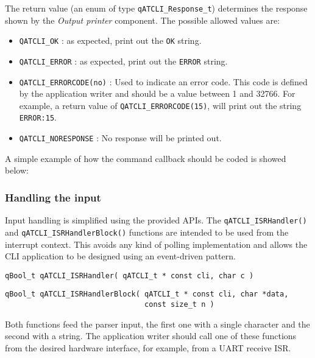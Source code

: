 The return value (an enum of type \lstinline{qATCLI_Response_t})  determines the response shown by the \textit{Output printer} component. The possible allowed values are:

\begin{itemize}
    \item \lstinline{QATCLI_OK} : as expected, print out the \lstinline{OK} string.
    \item \lstinline{QATCLI_ERROR} : as expected, print out the \lstinline{ERROR} string.
    \item \lstinline{QATCLI_ERRORCODE(no)} : Used to indicate an error code. This code is defined by the application writer and should be a value between 1 and 32766. For example, a return value of \lstinline{QATCLI_ERRORCODE(15)}, will print out the string \lstinline{ERROR:15}.
    \item \lstinline{QATCLI_NORESPONSE} : No response will be printed out.
\end{itemize}


A simple example of how the command callback should be coded is showed below:
\medskip




\subsubsection{Handling the input}
Input handling is simplified using the provided APIs. The \lstinline{qATCLI_ISRHandler()}  and \lstinline{qATCLI_ISRHandlerBlock()}   functions are intended to be used from the interrupt context. This avoids any kind of polling implementation and allows the CLI application to be designed using an event-driven pattern.
\medskip
\begin{lstlisting}[style=CStyle]
qBool_t qATCLI_ISRHandler( qATCLI_t * const cli, char c )
\end{lstlisting}

\begin{lstlisting}[style=CStyle]
qBool_t qATCLI_ISRHandlerBlock( qATCLI_t * const cli, char *data, 
                                const size_t n )
\end{lstlisting}

Both functions feed the parser input, the first one with a single character and the second with a string. The application writer should call one of these functions from the desired hardware interface, for example, from a UART receive ISR. 

